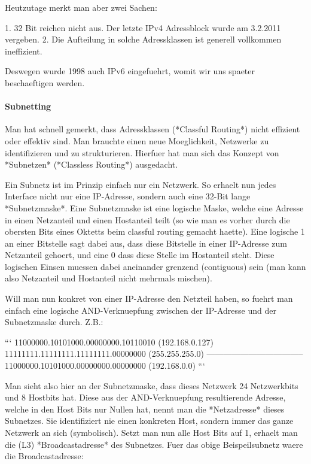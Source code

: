Heutzutage merkt man aber zwei Sachen:

1. 32 Bit reichen nicht aus. Der letzte IPv4 Adressblock wurde am 3.2.2011
   vergeben.
2. Die Aufteilung in solche Adressklassen ist generell vollkommen ineffizient.

Deswegen wurde 1998 auch IPv6 eingefuehrt, womit wir uns spaeter beschaeftigen
werden.

\paragraph{Subnetting} 

Man hat schnell gemerkt, dass Adressklassen (*Classful Routing*) nicht effizient
oder effektiv sind. Man brauchte einen neue Moeglichkeit, Netzwerke zu
identifizieren und zu strukturieren. Hierfuer hat man sich das Konzept von
*Subnetzen* (*Classless Routing*) ausgedacht.

Ein Subnetz ist im Prinzip einfach nur ein Netzwerk. So erhaelt nun jedes
Interface nicht nur eine IP-Adresse, sondern auch eine 32-Bit lange
*Subnetzmaske*. Eine Subnetzmaske ist eine logische Maske, welche eine Adresse
in einen Netzanteil und einen Hostanteil teilt (so wie man es vorher durch die
obersten Bits eines Oktetts beim classful routing gemacht haette). Eine logische
1 an einer Bitstelle sagt dabei aus, dass diese Bitstelle in einer IP-Adresse
zum Netzanteil gehoert, und eine 0 dass diese Stelle im Hostanteil steht. Diese
logischen Einsen muessen dabei aneinander grenzend (contiguous) sein (man kann
also Netzanteil und Hostanteil nicht mehrmals mischen).

Will man nun konkret von einer IP-Adresse den Netzteil haben, so fuehrt man
einfach eine logische AND-Verknuepfung zwischen der IP-Adresse und der
Subnetzmaske durch. Z.B.:

```
11000000.10101000.00000000.10110010 (192.168.0.127)
11111111.11111111.11111111.00000000 (255.255.255.0)
-----------------------------------
11000000.10101000.00000000.00000000 (192.168.0.0)
```

Man sieht also hier an der Subnetzmaske, dass dieses Netzwerk 24 Netzwerkbits
und 8 Hostbits hat. Diese aus der AND-Verknuepfung resultierende Adresse, welche
in den Host Bits nur Nullen hat, nennt man die *Netzadresse* dieses
Subnetzes. Sie identifiziert nie einen konkreten Host, sondern immer das ganze
Netzwerk an sich (symbolisch). Setzt man nun alle Host Bits auf 1, erhaelt man
die (L3) *Broadcastadresse* des Subnetzes. Fuer das obige Beispeilsubnetz waere
die Broadcastadresse:

